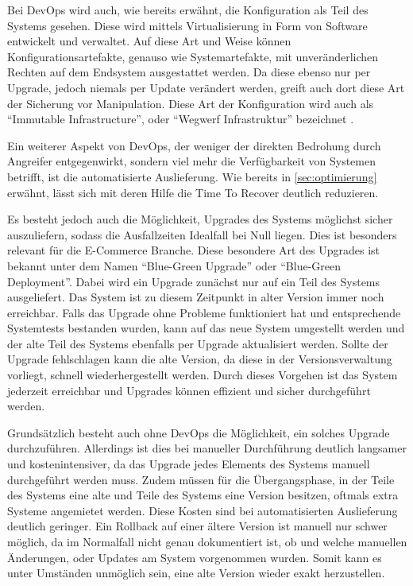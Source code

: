 Bei DevOps wird auch, wie bereits erwähnt, die Konfiguration als Teil des Systems gesehen. 
Diese wird mittels Virtualisierung in Form von Software entwickelt und verwaltet. 
Auf diese Art und Weise können Konfigurationsartefakte, genauso wie Systemartefakte, mit unveränderlichen Rechten auf dem Endsystem ausgestattet werden. 
Da diese ebenso nur per Upgrade, jedoch niemals per Update verändert werden, greift auch dort diese Art der Sicherung vor Manipulation. 
Diese Art der Konfiguration wird auch als \enquote{Immutable Infrastructure}, oder \enquote{Wegwerf Infrastruktur} bezeichnet \parencite[vgl.][S. 16]{matthias:2015}.

Ein weiterer Aspekt von DevOps, der weniger der direkten Bedrohung durch Angreifer entgegenwirkt, sondern viel mehr die Verfügbarkeit von Systemen betrifft, ist die automatisierte Auslieferung. 
Wie bereits in \autoref{sec:optimierung} erwähnt, lässt sich mit deren Hilfe die Time To Recover deutlich reduzieren. 

Es besteht jedoch auch die Möglichkeit, Upgrades des Systems möglichst sicher auszuliefern, sodass die Ausfallzeiten Idealfall bei Null liegen. 
Dies ist besonders relevant für die E-Commerce Branche. 
Diese besondere Art des Upgrades ist bekannt unter dem Namen \enquote{Blue-Green Upgrade} oder \enquote{Blue-Green Deployment}. 
Dabei wird ein Upgrade zunächst nur auf ein Teil des Systems ausgeliefert. Das System ist zu diesem Zeitpunkt in alter Version immer noch erreichbar. 
Falls das Upgrade ohne Probleme funktioniert hat und entsprechende Systemtests bestanden wurden, kann auf das neue System umgestellt werden und der alte Teil des Systems ebenfalls per Upgrade aktualisiert werden. 
Sollte der Upgrade fehlschlagen kann die alte Version, da diese in der Versionsverwaltung vorliegt, schnell wiederhergestellt werden. 
Durch dieses Vorgehen ist das System jederzeit erreichbar und Upgrades können effizient und sicher durchgeführt werden.
\parencite[Vgl.][S. 103 f.]{bass:2015}

Grundsätzlich besteht auch ohne DevOps die Möglichkeit, ein solches Upgrade durchzuführen. 
Allerdings ist dies bei manueller Durchführung deutlich langsamer und kostenintensiver, da das Upgrade jedes Elements des Systems manuell durchgeführt werden muss. 
Zudem müssen für die Übergangsphase, in der Teile des Systems eine alte und Teile des Systems eine Version besitzen, oftmals extra Systeme angemietet werden. 
Diese Kosten sind bei automatisierten Auslieferung deutlich geringer. 
Ein Rollback auf einer ältere Version ist manuell nur schwer möglich, da im Normalfall nicht genau dokumentiert ist, ob und welche manuellen Änderungen, oder Updates am System vorgenommen wurden. 
Somit kann es unter Umständen unmöglich sein, eine alte Version wieder exakt herzustellen.

